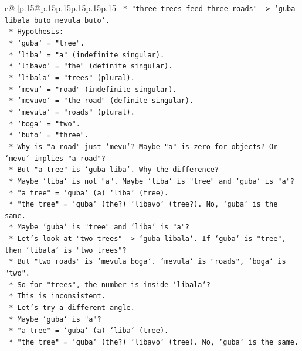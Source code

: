 \documentclass{article}
\begin{document}
{\begin{supertabular}{c@{$\;$}|p{.15\linewidth}@{}p{.15\linewidth}p{.15\linewidth}p{.15\linewidth}p{.15\linewidth}p{.15\linewidth}}
{{{\texttt{        *   "three trees feed three roads" {-}> `guba libala buto mevula buto`.} \\
\texttt{        *   Hypothesis:} \\
\texttt{            *   `guba` = "tree".} \\
\texttt{            *   `liba` = "a" (indefinite singular).} \\
\texttt{            *   `libavo` = "the" (definite singular).} \\
\texttt{            *   `libala` = "trees" (plural).} \\
\texttt{            *   `mevu` = "road" (indefinite singular).} \\
\texttt{            *   `mevuvo` = "the road" (definite singular).} \\
\texttt{            *   `mevula` = "roads" (plural).} \\
\texttt{            *   `boga` = "two".} \\
\texttt{            *   `buto` = "three".} \\
\texttt{        *   Why is "a road" just `mevu`? Maybe "a" is zero for objects? Or `mevu` implies "a road"?} \\
\texttt{        *   But "a tree" is `guba liba`. Why the difference?} \\
\texttt{        *   Maybe `liba` is not "a". Maybe `liba` is "tree" and `guba` is "a"?} \\
\texttt{        *   "a tree" = `guba` (a) `liba` (tree).} \\
\texttt{        *   "the tree" = `guba` (the?) `libavo` (tree?). No, `guba` is the same.} \\
\texttt{        *   Maybe `guba` is "tree" and `liba` is "a"?} \\
\texttt{        *   Let's look at "two trees" {-}> `guba libala`. If `guba` is "tree", then `libala` is "two trees"?} \\
\texttt{        *   But "two roads" is `mevula boga`. `mevula` is "roads", `boga` is "two".} \\
\texttt{        *   So for "trees", the number is inside `libala`?} \\
\texttt{        *   This is inconsistent.} \\
\texttt{        *   Let's try a different angle.} \\
\texttt{        *   Maybe `guba` is "a"?} \\
\texttt{        *   "a tree" = `guba` (a) `liba` (tree).} \\
\texttt{        *   "the tree" = `guba` (the?) `libavo` (tree). No, `guba` is the same.} \\
}}}
\end{supertabular}}
\end{document}
